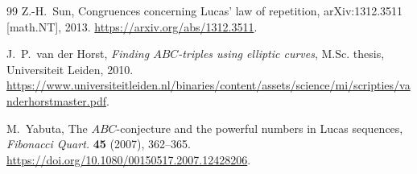 \documentclass[11pt]{article}
\theoremstyle{remark}
\begin{document}
\begin{thebibliography}{99}
Z.-H.~Sun,
\newblock Congruences concerning Lucas' law of repetition,
\newblock arXiv:1312.3511 [math.NT], 2013.
\newblock \url{https://arxiv.org/abs/1312.3511}.

J.~P.~van der Horst,
\newblock \emph{Finding \(ABC\)-triples using elliptic curves},
\newblock M.Sc. thesis, Universiteit Leiden, 2010.
\newblock
\url{https://www.universiteitleiden.nl/binaries/content/assets/science/mi/scripties/vanderhorstmaster.pdf}.

M.~Yabuta,
\newblock The \(ABC\)-conjecture and the powerful numbers in Lucas
sequences,
\newblock \emph{Fibonacci Quart.} \textbf{45} (2007), 362--365.
\newblock \url{https://doi.org/10.1080/00150517.2007.12428206}.

\end{thebibliography}
\end{document}
